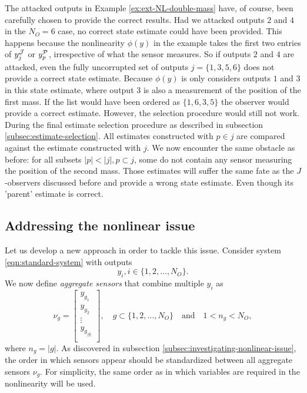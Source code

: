 The attacked outputs in Example \ref{ex:ext-NL-double-mass} have, of course, been carefully chosen to provide the correct results. Had we attacked outputs $2$ and $4$ in the $N_O=6$ case, no correct state estimate could have been provided. This happens because the nonlinearity $\phi(y)$ in the example takes the first two entries of $y^{\mathcal{J}}_{j}$ or $y^{\mathcal{P}}_{p}$, irrespective of what the sensor measures. So if outputs $2$ and $4$ are attacked, even the fully uncorrupted set of outputs $j=\{1,3,5,6\}$ does not provide a correct state estimate. Because $\phi(y)$ is only considers outputs $1$ and $3$ in this state estimate, where output 3 is also a measurement of the position of the first mass. If the list would have been ordered as $\{1,6,3,5\}$ the observer would provide a correct estimate. However, the selection procedure would still not work. During the final estimate selection procedure as described in subsection \ref{subsec:estimate-selection}. All estimates constructed with $p \in j$ are compared against the estimate constructed with $j$. We now encounter the same obstacle as before: for all subsets $|p| < |j|, p \subset j$, some do not contain any sensor measuring the position of the second mass. Those estimates will suffer the same fate as the $J$-observers discussed before and provide a wrong state estimate. Even though its 'parent' estimate is correct.

\subsection{Addressing the nonlinear issue}
Let us develop a new approach in order to tackle this issue. Consider system \eqref{eqn:standard-system} with outputs
\begin{equation*}
    y_i, i \in \{1,2,\dots,N_O\}.
\end{equation*}
We now define \textit{aggregate sensors} that combine multiple $y_i$ as
\begin{equation*}
    \nu_g = 
    \begin{bmatrix}
        y_{g_1} \\ y_{g_2} \\ \vdots \\ y_{g_{|g|}} \\
    \end{bmatrix}
    , \quad g \subset \{1,2,\dots,N_O\} \quad \text{and} \quad 1 < n_g < N_O,
\end{equation*}
where $n_g=|g|$. As discovered in subsection \ref{subsec:investigating-nonlinear-issue}, the order in which sensors appear should be standardized between all aggregate sensors $\nu_g$. For simplicity, the same order as in which variables are required in the nonlinearity will be used.

